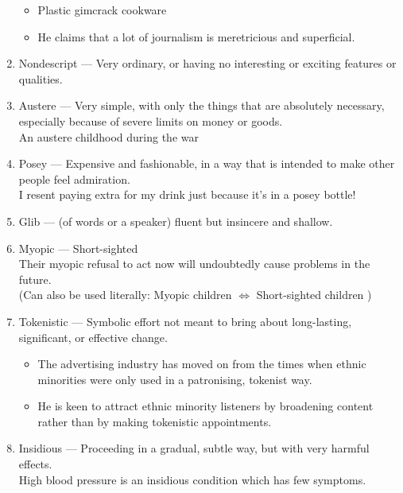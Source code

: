 \documentclass[oneside]{book}
\begin{document}
\begin{enumerate}
        \footnotesize \begin{itemize}
            \item Plastic gimcrack cookware
            \item He claims that a lot of journalism is meretricious and superficial.
        \end{itemize} \normalsize
        \item Nondescript --- Very ordinary, \footnotesize or having no interesting or exciting features or qualities. \normalsize
        \item Austere --- Very simple, with only the things that are absolutely necessary, \footnotesize especially because of severe limits on money or goods. \normalsize \\
        \footnotesize An austere childhood during the war \normalsize
        \item Posey --- Expensive and fashionable, \small in a way that is intended to make other people feel admiration. \normalsize \\
        \footnotesize I resent paying extra for my drink just because it's in a posey bottle! \normalsize
        \item Glib --- (of words or a speaker) fluent but insincere and shallow.
        \item Myopic --- Short-sighted\\
        \footnotesize Their myopic refusal to act now will undoubtedly cause problems in the future.\\ (Can also be used literally: Myopic children \( \iff \) Short-sighted children ) \normalsize 
        \item Tokenistic --- Symbolic effort not meant to bring about long-lasting, significant, or effective change. 
        \begin{itemize} \footnotesize
            \item The advertising industry has moved on from the times when ethnic minorities were only used in a patronising, tokenist way.
            \item He is keen to attract ethnic minority listeners by broadening content rather than by making tokenistic appointments.
        \end{itemize} \normalsize
        \item Insidious --- Proceeding in a gradual, subtle way, but with very harmful effects.\\
        \footnotesize High blood pressure is an insidious condition which has few symptoms. \normalsize

\end{enumerate}
\end{document}
